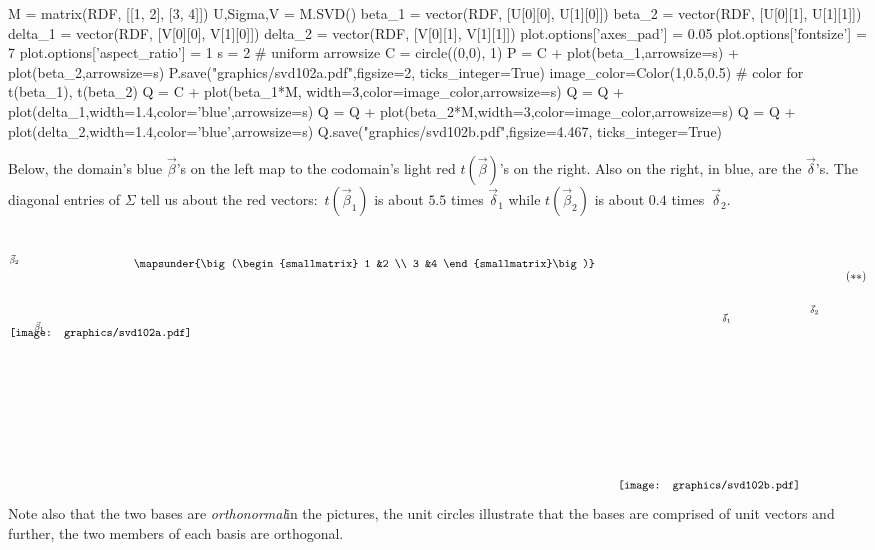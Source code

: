 \begin{sagesilent}
M = matrix(RDF, [[1, 2], [3, 4]])
U,Sigma,V = M.SVD()
beta_1 = vector(RDF, [U[0][0], U[1][0]])
beta_2 = vector(RDF, [U[0][1], U[1][1]])
delta_1 = vector(RDF, [V[0][0], V[1][0]])
delta_2 = vector(RDF, [V[0][1], V[1][1]])
plot.options['axes_pad'] = 0.05
plot.options['fontsize'] = 7
plot.options['aspect_ratio'] = 1
s = 2  # uniform arrowsize
C = circle((0,0), 1)
P = C + plot(beta_1,arrowsize=s) + plot(beta_2,arrowsize=s)
P.save("graphics/svd102a.pdf",figsize=2, ticks_integer=True)
image_color=Color(1,0.5,0.5)   # color for t(beta_1), t(beta_2)
Q = C + plot(beta_1*M, width=3,color=image_color,arrowsize=s) 
Q = Q + plot(delta_1,width=1.4,color='blue',arrowsize=s) 
Q = Q + plot(beta_2*M,width=3,color=image_color,arrowsize=s) 
Q = Q + plot(delta_2,width=1.4,color='blue',arrowsize=s)
Q.save("graphics/svd102b.pdf",figsize=4.467, ticks_integer=True)
\end{sagesilent}
Below, the domain's 
blue $\vec{\beta}$'s on the left map to the codomain's light red 
$t(\vec{\beta})$'s on the right.
Also on the right, in blue, are the $\vec{\delta}$'s.
The diagonal entries of $\Sigma$ tell us about the
red vectors:~$t(\vec{\beta}_1)$ is about $5.5$ times $\vec{\delta}_1$
while $t(\vec{\beta}_2)$ is about $0.4$ times~$\vec{\delta}_2$.
\begin{equation*}
  \setlength{\unitlength}{1in}
  \begin{picture}(1.35,1.35)
    \put(0,1.825){\texttt{[image: graphics/svd102a.pdf]}}
    \put(.3,1.9){\scriptsize $\vec{\beta}_1$}
    \put(0,2.7){\scriptsize $\vec{\beta}_2$}
  \end{picture}
  \quad
  \raisebox{2.65in}{$\mapsunder{\big (\begin{smallmatrix} 1 &2 \\ 3 &4 \end{smallmatrix}\big )}$}
  \qquad
  \begin{picture}(2.45,3.15)
    \put(0,0){\texttt{[image: graphics/svd102b.pdf]}}
    \put(1.25,2){\scriptsize $\vec{\delta}_1$}
    \put(2.3,2.1){\scriptsize $\vec{\delta}_2$}
  \end{picture}
  \tag*{\raisebox{2.5in}{($**$)}}
\end{equation*}
Note also that the two bases are \textit{orthonormal}\Dash in
the pictures, the unit circles illustrate
that the bases are comprised of unit vectors and further,
the two members of each basis are orthogonal.

